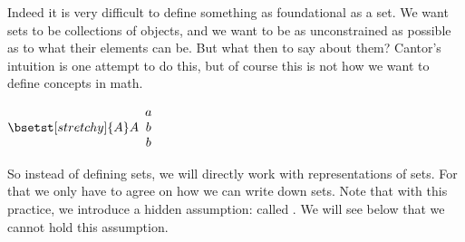 \documentclass[notes,mh]{mikoslides}
\begin{document}
\begin{module}[id=sets-introduction]
\begin{note}
\begin{omtext}
  Indeed it is very difficult to define something as foundational as a set. We want sets
  to be collections of objects, and we want to be as unconstrained as possible as to what
  their elements can be. But what then to say about them? Cantor's intuition is one
  attempt to do this, but of course this is not how we want to define concepts in math.

  $\bsetst[stretchy]{A}A{\begin{array}{c}a\\b\\b\end{array}}$

  So instead of defining sets, we will directly work with representations of sets. For
  that we only have to agree on how we can write down sets. Note that with this practice,
  we introduce a hidden assumption: called . We will see below that we
  cannot hold this assumption.
\end{omtext}
\end{note}
\end{module}
\end{document}
